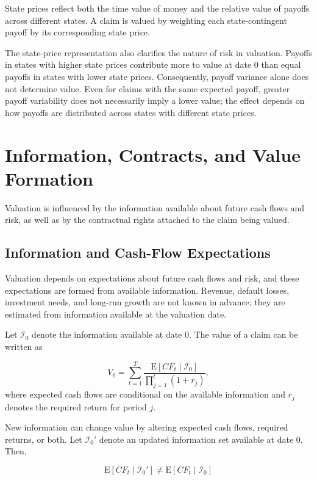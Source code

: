 State prices reflect both the time value of money and the relative value of payoffs across different states. A claim is valued by weighting each state-contingent payoff by its corresponding state price. 

The state-price representation also clarifies the nature of risk in valuation. Payoffs in states with higher state prices contribute more to value at date 0 than equal payoffs in states with lower state prices. Consequently, payoff variance alone does not determine value. Even for claims with the same expected payoff, greater payoff variability does not necessarily imply a lower value; the effect depends on how payoffs are distributed across states with different state prices.

\section{Information, Contracts, and Value Formation}

Valuation is influenced by the information available about future cash flows and risk, as well as by the contractual rights attached to the claim being valued.

\subsection{Information and Cash-Flow Expectations}

Valuation depends on expectations about future cash flows and risk, and these expectations are formed from available information. Revenue, default losses, investment needs, and long-run growth are not known in advance; they are estimated from information available at the valuation date.

Let $\mathcal{I}_0$ denote the information available at date 0. The value of a claim can be written as

\begin{equation}
V_0=\sum_{t=1}^{T}
\frac{\mathrm{E}[CF_t\mid \mathcal{I}_0]}
{\prod_{j=1}^{t}(1+r_j)},
\label{eq:ch5-information-conditional-value}
\end{equation}
where expected cash flows are conditional on the available information and $r_j$ denotes the required return for period $j$.

New information can change value by altering expected
cash flows, required returns, or both. Let
$\mathcal{I}_0'$ denote an updated information set
available at date 0. Then,

\begin{equation*}
\mathrm{E}[CF_t\mid \mathcal{I}_0']
\neq
\mathrm{E}[CF_t\mid \mathcal{I}_0]
\end{equation*}

